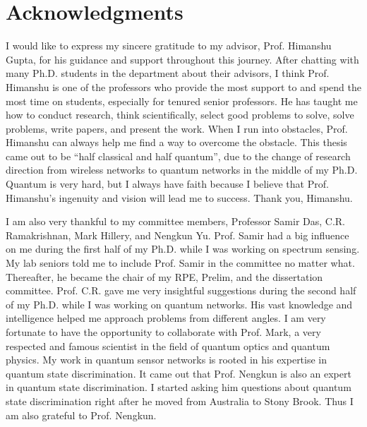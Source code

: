 \chapter{Acknowledgments}


I would like to express my sincere gratitude to my advisor, Prof. Himanshu Gupta, for his guidance and support throughout this journey. 
After chatting with many Ph.D. students in the department about their advisors, I think Prof. Himanshu is one of the professors who provide 
the most support to and spend the most time on students, especially for tenured senior professors.
He has taught me how to conduct research, think scientifically, select good problems to solve, solve problems, write papers, and present the work.
When I run into obstacles, Prof. Himanshu can always help me find a way to overcome the obstacle.
This thesis came out to be ``half classical and half quantum'', due to the change of research direction from wireless networks to
quantum networks in the middle of my Ph.D. Quantum is very hard, but I always have faith because I believe that 
Prof. Himanshu's ingenuity and vision will lead me to success. Thank you, Himanshu.

I am also very thankful to my committee members, Professor Samir Das, C.R. Ramakrishnan, Mark Hillery, and Nengkun Yu. 
Prof. Samir had a big influence on me during the first half of my Ph.D. while I was working on spectrum sensing.
My lab seniors told me to include Prof. Samir in the committee no matter what. 
Thereafter, he became the chair of my RPE, Prelim, and the dissertation committee.
Prof. C.R. gave me very insightful suggestions during the second half of my Ph.D. while I was working on quantum networks.
His vast knowledge and intelligence helped me approach problems from different angles.
I am very fortunate to have the opportunity to collaborate with Prof. Mark, a very respected and famous scientist 
in the field of quantum optics and quantum physics. My work in quantum sensor networks is rooted in his expertise in quantum state discrimination.
It came out that Prof. Nengkun is also an expert in quantum state discrimination. I started asking him questions about quantum state discrimination right after
he moved from Australia to Stony Brook. Thus I am also grateful to Prof. Nengkun.

